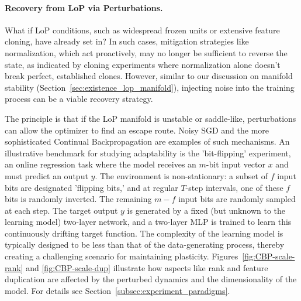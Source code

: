 \documentclass{article}
\numberwithin{figure}{section}
\begin{document}
\paragraph{Recovery from LoP via Perturbations.}
What if LoP conditions, such as widespread frozen units or extensive feature cloning, have already set in? In such cases, mitigation strategies like normalization, which act proactively, may no longer be sufficient to reverse the state, as indicated by cloning experiments where normalization alone doesn't break perfect, established clones. However, similar to our discussion on manifold stability (Section~\ref{sec:existence_lop_manifold}), injecting noise into the training process can be a viable recovery strategy.

The principle is that if the LoP manifold is unstable or saddle-like, perturbations can allow the optimizer to find an escape route. Noisy SGD and the more sophisticated Continual Backpropagation \citep{dohare2024loss} are examples of such mechanisms. 
An illustrative benchmark for studying adaptability is the 'bit-flipping' experiment, an online regression task where the model receives an $m$-bit input vector $x$ and must predict an output $y$. The environment is non-stationary: a subset of $f$ input bits are designated 'flipping bits,' and at regular $T$-step intervals, one of these $f$ bits is randomly inverted. The remaining $m-f$ input bits are randomly sampled at each step. The target output $y$ is generated by a fixed (but unknown to the learning model) two-layer network, and a two-layer MLP is trained to learn this continuously drifting target function. The complexity of the learning model is typically designed to be less than that of the data-generating process, thereby creating a challenging scenario for maintaining plasticity. 
Figures~\ref{fig:CBP-scale-rank} and \ref{fig:CBP-scale-dup} illustrate how aspects like rank and feature duplication are affected by the perturbed dynamics and the dimensionality of the model. For details see Section~\ref{subsec:experiment_paradigms}.  
\end{document}
